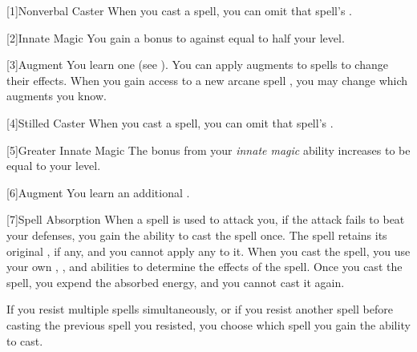         [1]{Nonverbal Caster} When you cast a spell, you can omit that spell's .

        [2]{Innate Magic} You gain a bonus to  against  equal to half your level.

        [3]{Augment} You learn one  (see ).
        You can apply augments to spells to change their effects.
        When you gain access to a new arcane spell , you may change which augments you know.

        [4]{Stilled Caster} When you cast a spell, you can omit that spell's .

        [5]{Greater Innate Magic} The bonus from your \textit{innate magic} ability increases to be equal to your level.

        [6]{Augment} You learn an additional .

        [7]{Spell Absorption} When a spell is used to attack you, if the attack fails to beat your defenses, you gain the ability to cast the spell once.
        The spell retains its original , if any, and you cannot apply any  to it.
        When you cast the spell, you use your own , , and abilities to determine the effects of the spell.
        Once you cast the spell, you expend the absorbed energy, and you cannot cast it again.

        If you resist multiple spells simultaneously, or if you resist another spell before casting the previous spell you resisted, you choose which spell you gain the ability to cast.

\newpage
